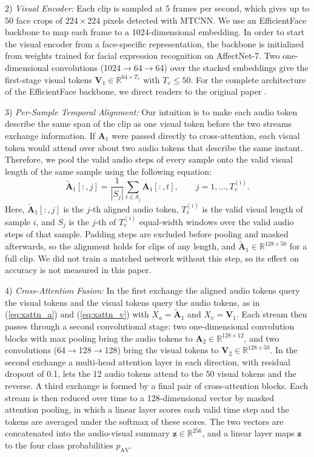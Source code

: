 \documentclass[journal]{IEEEtran}
\begin{document}
2) \emph{Visual Encoder:} Each clip is sampled at 5 frames per second, which gives up to 50 face crops of $224 \times 224$ pixels detected with MTCNN. We use an EfficientFace backbone \cite{zhao2021efficientface} to map each frame to a 1024-dimensional embedding. In order to start the visual encoder from a face-specific representation, the backbone is initialized from weights trained for facial expression recognition on AffectNet-7. Two one-dimensional convolutions (1024$\to$64$\to$64) over the stacked embeddings give the first-stage visual tokens $\mathbf{V}_1 \in \mathbb{R}^{64 \times T_v}$ with $T_v \le 50$. For the complete architecture of the EfficientFace backbone, we direct readers to the original paper \cite{zhao2021efficientface}.

3) \emph{Per-Sample Temporal Alignment:} Our intuition is to make each audio token describe the same span of the clip as one visual token before the two streams exchange information. If $\mathbf{A}_1$ were passed directly to cross-attention, each visual token would attend over about two audio tokens that describe the same instant. Therefore, we pool the valid audio steps of every sample onto the valid visual length of the same sample using the following equation:
\begin{equation}
\tilde{\mathbf{A}}_1[:, j] = \frac{1}{|S_j|}\sum_{t \in S_j} \mathbf{A}_1[:, t], \qquad j = 1,\dots,T_v^{(i)}.
\end{equation}
Here, $\tilde{\mathbf{A}}_1[:, j]$ is the $j$-th aligned audio token, $T_v^{(i)}$ is the valid visual length of sample $i$, and $S_j$ is the $j$-th of $T_v^{(i)}$ equal-width windows over the valid audio steps of that sample. Padding steps are excluded before pooling and masked afterwards, so the alignment holds for clips of any length, and $\tilde{\mathbf{A}}_1 \in \mathbb{R}^{128 \times 50}$ for a full clip. We did not train a matched network without this step, so its effect on accuracy is not measured in this paper.

4) \emph{Cross-Attention Fusion:} In the first exchange the aligned audio tokens query the visual tokens and the visual tokens query the audio tokens, as in (\ref{eq:xattn_a}) and (\ref{eq:xattn_v}) with $X_a = \tilde{\mathbf{A}}_1$ and $X_v = \mathbf{V}_1$. Each stream then passes through a second convolutional stage: two one-dimensional convolution blocks with max pooling bring the audio tokens to $\mathbf{A}_2 \in \mathbb{R}^{128 \times 12}$, and two convolutions (64$\to$128$\to$128) bring the visual tokens to $\mathbf{V}_2 \in \mathbb{R}^{128 \times 50}$. In the second exchange a multi-head attention layer in each direction, with residual dropout of 0.1, lets the 12 audio tokens attend to the 50 visual tokens and the reverse. A third exchange is formed by a final pair of cross-attention blocks. Each stream is then reduced over time to a 128-dimensional vector by masked attention pooling, in which a linear layer scores each valid time step and the tokens are averaged under the softmax of these scores. The two vectors are concatenated into the audio-visual summary $\mathbf{z} \in \mathbb{R}^{256}$, and a linear layer maps $\mathbf{z}$ to the four class probabilities $p_{\mathrm{AV}}$.
\end{document}
